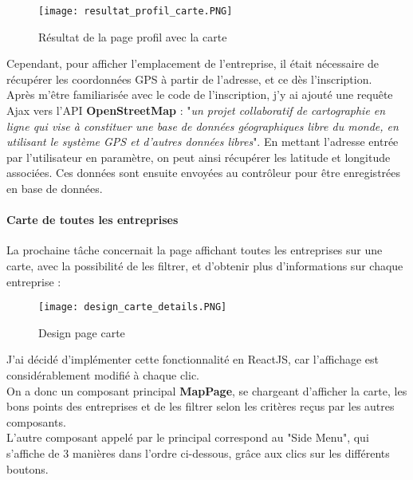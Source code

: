 \begin{figure}[H]
    \centering
    \texttt{[image: resultat\_profil\_carte.PNG]}
    \caption{Résultat de la page profil avec la carte}
\end{figure}

Cependant, pour afficher l'emplacement de l'entreprise, il était nécessaire de récupérer les coordonnées GPS à partir de l'adresse, et ce dès l'inscription.\\
Après m'être familiarisée avec le code de l'inscription, j'y ai ajouté une requête Ajax vers l'API \textbf{OpenStreetMap} : "\emph{un projet collaboratif de cartographie en ligne qui vise à constituer une base de données géographiques libre du monde, en utilisant le système GPS et d'autres données libres}".
En mettant l'adresse entrée par l'utilisateur en paramètre, on peut ainsi récupérer les latitude et longitude associées. Ces données sont ensuite envoyées au contrôleur pour être enregistrées en base de données.

\paragraph{Carte de toutes les entreprises}


La prochaine tâche concernait la page affichant toutes les entreprises sur une carte, avec la possibilité de les filtrer, et d'obtenir plus d'informations sur chaque entreprise :

\begin{figure}[H]
    \centering
    \texttt{[image: design\_carte\_details.PNG]}
    \caption{Design page carte}
\end{figure}

J'ai décidé d'implémenter cette fonctionnalité en ReactJS, car l'affichage est considérablement modifié à chaque clic.
\\On a donc un composant principal \textbf{MapPage}, se chargeant d'afficher la carte, les bons points des entreprises et de les filtrer selon les critères reçus par les autres composants.
\\L'autre composant appelé par le principal correspond au "Side Menu", qui s'affiche de 3 manières dans l'ordre ci-dessous, grâce aux clics sur les différents boutons.


